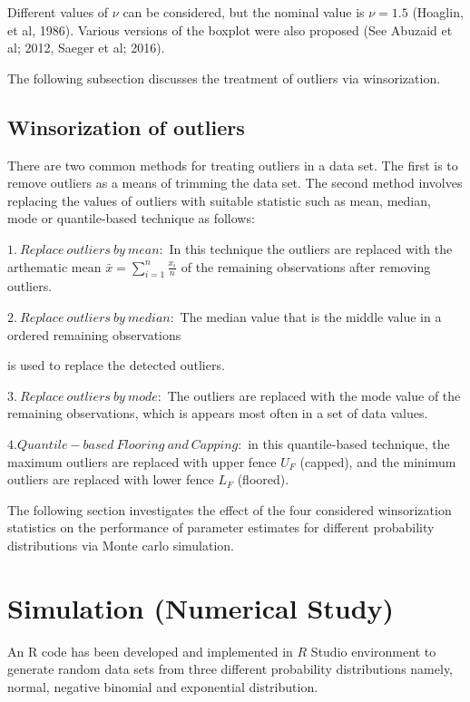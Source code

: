 \documentclass[notitlepage,12pt]{jedm}
\begin{document}
Different values of \(\nu\) can be considered, but the nominal value is
\(\nu=1.5\) (Hoaglin, et al, 1986). Various versions of the boxplot were
also proposed (See Abuzaid et al; 2012, Saeger et al; 2016).

The following subsection discusses the treatment of outliers via
winsorization.

\hypertarget{winsorization-of-outliers}{%
\subsection{Winsorization of outliers}\label{winsorization-of-outliers}}

There are two common methods for treating outliers in a data set. The
first is to remove outliers as a means of trimming the data set. The
second method involves replacing the values of outliers with suitable
statistic such as mean, median, mode or quantile-based technique as
follows:

\(1.\ Replace\ outliers\ by\ mean:\) In this technique the outliers are
replaced with the arthematic mean \(\bar{x}=\sum_{i=1}^n \frac{x_i}{n}\)
of the remaining observations after removing outliers.

\(2.\ Replace\ outliers\ by\ median:\) The median value that is the
middle value in a ordered remaining observations

is used to replace the detected outliers.

\(3.\ Replace \ outliers \ by \ mode:\) The outliers are replaced with
the mode value of the remaining observations, which is appears most
often in a set of data values.

\(4. Quantile-based \ Flooring \ and \ Capping:\) in this quantile-based
technique, the maximum outliers are replaced with upper fence \(U_F\)
(capped), and the minimum outliers are replaced with lower fence \(L_F\)
(floored).

The following section investigates the effect of the four considered
winsorization statistics on the performance of parameter estimates for
different probability distributions via Monte carlo simulation.

\hypertarget{simulation-numerical-study}{%
\section{Simulation (Numerical
Study)}\label{simulation-numerical-study}}

An R code has been developed and implemented in \(R\) Studio environment
to generate random data sets from three different probability
distributions namely, normal, negative binomial and exponential
distribution.
\end{document}
